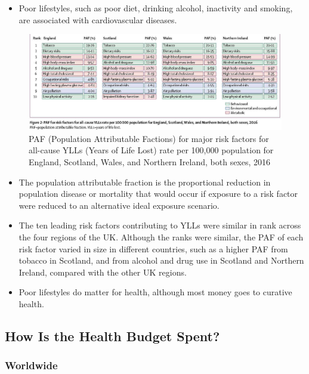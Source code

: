 \begin{itemize}           
        \item Poor lifestyles, such as poor diet, drinking alcohol, inactivity and smoking, are associated with cardiovascular diseases.
        \end{itemize}

\begin{figure}[H]%
                \centering
                \includegraphics[width=5in]{images/ch3/17.png}
                \caption{PAF (Population Attributable Factions) for major risk factors for all-cause YLLs (Years of Life Lost) rate per 100,000 population for England, Scotland, Wales, and Northern Ireland, both sexes, 2016}
            \end{figure} 

\begin{itemize}           
        \item The population attributable fraction is the proportional reduction in population disease or mortality that would occur if exposure to a risk factor were reduced to an alternative ideal exposure scenario. 
        \item The ten leading risk factors contributing to YLLs were similar in rank across the four regions of the UK. Although the ranks were similar, the PAF of each risk factor varied in size in different countries, such as a higher PAF from tobacco in Scotland, and from alcohol and drug use in Scotland and Northern Ireland, compared with the other UK regions.
        \item Poor lifestyles do matter for health, although most money goes to curative health.
        \end{itemize}

        \subsection{How Is the Health Budget Spent?} 
        \subsubsection{Worldwide}
        
